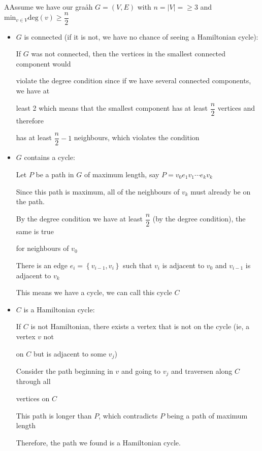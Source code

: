 \begin{prf}
  AAssume we have our graåh $G = (V,E)$ with $n = \left|V\right| = \geq3$ and $\text{min}_{v\in V}\text{deg}(v)\geq\dfrac{n}{2}$ 
  \par\bigskip
  \begin{itemize}
    \item $G$ is connected (if it is not, we have no chance of seeing a Hamiltonian cycle):\par
      If $G$ was not connected, then the vertices in the smallest connected component would\par violate the degree condition since if we have several connected components, we have at\par least 2 which means that the smallest component has at least $\dfrac{n}{2}$ vertices and therefore\par  has at least $\dfrac{n}{2}-1$ neighbours, which violates the condition
      \par\bigskip
    \item $G$ contains a cycle:\par
      Let $P$ be a path in $G$ of maximum length, say $P = v_0e_1v_1\cdots e_kv_k$ \par
      Since this path is maximum, all of the neighbours of $v_k$ must already be on the path.\par
      By the degree condition we have at least $\dfrac{n}{2}$ (by the degree condition), the same is true\par for neighbours of $v_0$ \par
      There is an edge $e_i = \left\{v_{i-1},v_i\right\}$ such that $v_i$ is adjacent to $v_0$ and $v_{i-1}$ is adjacent to $v_k$\par
      This means we have a cycle, we can call this cycle $C$
      \par\bigskip
    \item $C$ is a Hamiltonian cycle:\par
      If $C$ is not Hamiltonian, there exists a vertex that is not on the cycle (ie, a vertex $v$ not\par on $C$ but is adjacent to some $v_j$)\par
      Consider the path beginning in $v$ and going to $v_j$ and traversen along $C$ through all\par vertices on $C$\par
      This path is longer than $P$, which contradicts $P$ being a path of maximum length\par
      Therefore, the path we found is a Hamiltonian cycle. 
  \end{itemize}
\end{prf}
